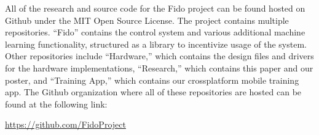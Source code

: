 All of the research and source code for the Fido project can be found hosted on Github under the MIT Open Source License.  The project contains multiple repositories. ``Fido'' contains the control system and various additional machine learning functionality, structured as a library to incentivize usage of the system.  Other repositories include ``Hardware,'' which contains the design files and drivers for the hardware implementations, ``Research,'' which contains this paper and our poster, and ``Training App,'' which contains our crossplatform mobile training app.  The Github organization where all of these repositories are hosted can be found at the following link:

\vspace{0.5cm}
\centering
\url{https://github.com/FidoProject}
